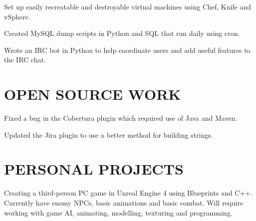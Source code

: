 \documentclass[letterpaper]{deedy-resume-modified} %
\begin{document}
\begin{minipage}[t]{0.66\textwidth}
\sectionspace %



\begin{tightitemize}
\item Set up easily recreatable and destroyable virtual machines using Chef, Knife and vSphere.
\item Created MySQL dump scripts in Python and SQL that run daily using cron.
\item Wrote an IRC bot in Python to help coordinate users and add useful features to the IRC chat.
\end{tightitemize}

\sectionspace %


\section{OPEN SOURCE WORK}

\begin{tightitemize}
\item Fixed a bug in the Cobertura plugin which required use of Java and Maven.
\item Updated the Jira plugin to use a better method for building strings.
\end{tightitemize}

\sectionspace %


\section{PERSONAL PROJECTS}


Creating a third-person PC game in Unreal Engine 4 using Blueprints and C++.  Currently have enemy NPCs, basic animations and basic combat.  Will require working with game AI, animating, modelling, texturing and programming.  


\end{minipage}
\end{document}
